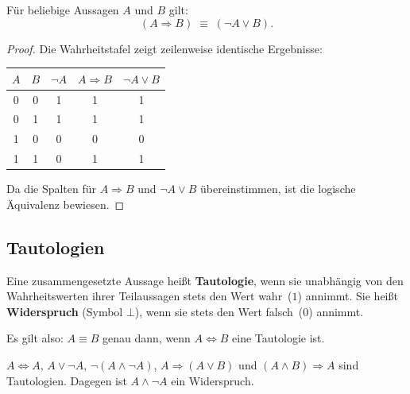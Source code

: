 \begin{satz}
Für beliebige Aussagen $A$ und $B$ gilt:
\[
(A \Rightarrow B) \;\equiv\; (\neg A \lor B).
\]
\end{satz}

\begin{proof}
Die Wahrheitstafel zeigt zeilenweise identische Ergebnisse:
\begin{center}
\renewcommand{\arraystretch}{1.15}
\begin{tabular}{ccccc}
    \toprule
    $A$ & $B$ & $\neg A$ & $A \Rightarrow B$ & $\neg A \lor B$ \\
    \midrule
    0 & 0 & 1 & 1 & 1 \\
    0 & 1 & 1 & 1 & 1 \\
    1 & 0 & 0 & 0 & 0 \\
    1 & 1 & 0 & 1 & 1 \\
    \bottomrule
\end{tabular}
\end{center}
Da die Spalten für $A \Rightarrow B$ und $\neg A \lor B$ übereinstimmen, ist die logische Äquivalenz bewiesen.
\end{proof}

\subsection{Tautologien}

\begin{definition}
Eine zusammengesetzte Aussage heißt \textbf{Tautologie}, wenn sie unabhängig von den Wahrheitswerten ihrer Teilaussagen stets den Wert \glqq wahr\grqq\ ($1$) annimmt.\newline
Sie heißt \textbf{Widerspruch} (Symbol $\bot$), wenn sie stets den Wert \glqq falsch\grqq\ ($0$) annimmt.
\end{definition}

Es gilt also: $A \equiv B$ genau dann, wenn $A \Leftrightarrow B$ eine Tautologie ist.

\begin{beispiel}
$A\Leftrightarrow A$, $A\lor\neg A$, $\neg(A\land\neg A)$,
$A\Rightarrow(A\lor B)$ und $(A\land B)\Rightarrow A$ sind
Tautologien. Dagegen ist $A\land\neg A$ ein Widerspruch.
\end{beispiel}

